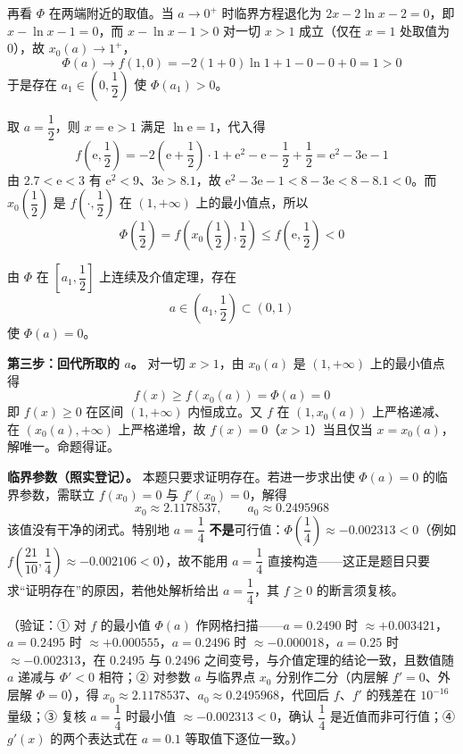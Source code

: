 \begin{answer}
再看 \(\Phi\) 在两端附近的取值。当 \(a\to0^{+}\) 时临界方程退化为 \(2x-2\ln x-2=0\)，即 \(x-\ln x-1=0\)，而 \(x-\ln x-1>0\) 对一切 \(x>1\) 成立（仅在 \(x=1\) 处取值为 \(0\)），故 \(x_0(a)\to1^{+}\)，
\nopagebreak[4]
\[\Phi(a)\to f(1,0)=-2(1+0)\ln1+1-0-0+0=1>0\]
于是存在 \(a_1\in\left(0,\dfrac12\right)\) 使 \(\Phi(a_1)>0\)。

取 \(a=\dfrac12\)，则 \(x=\mathrm e>1\) 满足 \(\ln\mathrm e=1\)，代入得
\nopagebreak[4]
\[f\left(\mathrm e,\dfrac12\right)=-2\left(\mathrm e+\dfrac12\right)\cdot1+\mathrm e^{2}-\mathrm e-\dfrac12+\dfrac12=\mathrm e^{2}-3\mathrm e-1\]
由 \(2.7<\mathrm e<3\) 有 \(\mathrm e^{2}<9\)、\(3\mathrm e>8.1\)，故 \(\mathrm e^{2}-3\mathrm e-1<8-3\mathrm e<8-8.1<0\)。而 \(x_0\left(\dfrac12\right)\) 是 \(f\left(\cdot,\dfrac12\right)\) 在 \((1,+\infty)\) 上的最小值点，所以
\nopagebreak[4]
\[\Phi\left(\dfrac12\right)=f\left(x_0\left(\dfrac12\right),\dfrac12\right)\leqslant f\left(\mathrm e,\dfrac12\right)<0\]

由 \(\Phi\) 在 \(\left[a_1,\dfrac12\right]\) 上连续及介值定理，存在
\nopagebreak[4]
\[a\in\left(a_1,\dfrac12\right)\subset(0,1)\]
使 \(\Phi(a)=0\)。

\textbf{第三步：回代所取的 \(a\)。} 对一切 \(x>1\)，由 \(x_0(a)\) 是 \((1,+\infty)\) 上的最小值点得
\nopagebreak[4]
\[f(x)\geqslant f(x_0(a))=\Phi(a)=0\]
即 \(f(x)\geqslant0\) 在区间 \((1,+\infty)\) 内恒成立。又 \(f\) 在 \((1,x_0(a))\) 上严格递减、在 \((x_0(a),+\infty)\) 上严格递增，故 \(f(x)=0\)（\(x>1\)）当且仅当 \(x=x_0(a)\)，解唯一。命题得证。

\textbf{临界参数（照实登记）。} 本题只要求证明存在。若进一步求出使 \(\Phi(a)=0\) 的临界参数，需联立 \(f(x_0)=0\) 与 \(f'(x_0)=0\)，解得
\nopagebreak[4]
\[x_0\approx2.1178537,\qquad a_0\approx0.2495968\]
该值没有干净的闭式。特别地 \(a=\dfrac14\) \textbf{不是}可行值：\(\Phi\left(\dfrac14\right)\approx-0.002313<0\)（例如 \(f\left(\dfrac{21}{10},\dfrac14\right)\approx-0.002106<0\)），故不能用 \(a=\dfrac14\) 直接构造——这正是题目只要求“证明存在”的原因，若他处解析给出 \(a=\dfrac14\)，其 \(f\geqslant0\) 的断言须复核。

（验证：① 对 \(f\) 的最小值 \(\Phi(a)\) 作网格扫描——\(a=0.2490\) 时 \(\approx+0.003421\)，\(a=0.2495\) 时 \(\approx+0.000555\)，\(a=0.2496\) 时 \(\approx-0.000018\)，\(a=0.25\) 时 \(\approx-0.002313\)，在 \(0.2495\) 与 \(0.2496\) 之间变号，与介值定理的结论一致，且数值随 \(a\) 递减与 \(\Phi'<0\) 相符；② 对参数 \(a\) 与临界点 \(x_0\) 分别作二分（内层解 \(f'=0\)、外层解 \(\Phi=0\)），得 \(x_0\approx2.1178537\)、\(a_0\approx0.2495968\)，代回后 \(f\)、\(f'\) 的残差在 \(10^{-16}\) 量级；③ 复核 \(a=\dfrac14\) 时最小值 \(\approx-0.002313<0\)，确认 \(\dfrac14\) 是近值而非可行值；④ \(g'(x)\) 的两个表达式在 \(a=0.1\) 等取值下逐位一致。）


\end{answer}
